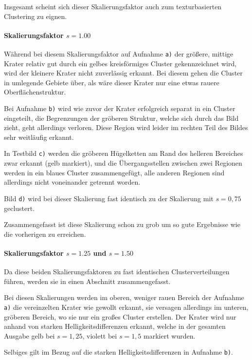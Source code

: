 Insgesamt scheint sich dieser Skalierungsfaktor auch zum texturbasierten Clustering zu eignen.

\paragraph{Skalierungsfaktor $s=1.00$}

Während bei diesem Skalierungsfaktor auf Aufnahme \texttt{a)} der größere, mittige Krater relativ gut durch ein gelbes kreisförmiges Cluster gekennzeichnet wird, wird der kleinere Krater nicht zuverlässig erkannt. Bei diesem gehen die Cluster in umlegende Gebiete über, als wäre dieser Krater nur eine etwas rauere Oberflächenstruktur.

Bei Aufnahme \texttt{b)} wird wie zuvor der Krater erfolgreich separat in ein Cluster eingeteilt, die Begrenzungen der gröberen Struktur, welche sich durch das Bild zieht, geht allerdings verloren. Diese Region wird leider im rechten Teil des Bildes sehr weitläufig erkannt.

In Testbild \texttt{c)} werden die gröberen Hügelketten am Rand des helleren Bereiches zwar erkannt (gelb markiert), und die Übergangsstellen zwischen zwei Regionen werden in ein blaues Cluster zusammengefügt, alle anderen Regionen sind allerdings nicht voneinander getrennt worden.

Bild \texttt{d)} wird bei dieser Skalierung fast identisch zu der Skalierung mit $s=0,75$ geclustert.

Zusammengefasst ist diese Skalierung schon zu grob um so gute Ergebnisse wie die vorherigen zu erreichen.

\paragraph{Skalierungsfaktor $s=1.25$ und $s=1.50$}

Da diese beiden Skalierungsfaktoren zu fast identischen Clusterverteilungen führen, werden sie in einen Abschnitt zusammengefasst.

Bei diesen Skalierungen werden im oberen, weniger rauen Bereich der Aufnahme \texttt{a)} die vereinzelten Krater wie gewollt erkannt, sie versagen allerdings im unteren, gröberen Bereich, wo sie nur ein großes Cluster erstellen. Der Krater wird nur anhand von starken Helligkeitsdifferenzen erkannt, welche in der gesamten Ausgabe gelb bei $s=1,25$, \bzw violett bei $s=1,5$ markiert wurden. 

Selbiges gilt im Bezug auf die starken Helligkeitsdifferenzen in Aufnahme \texttt{b)}.

